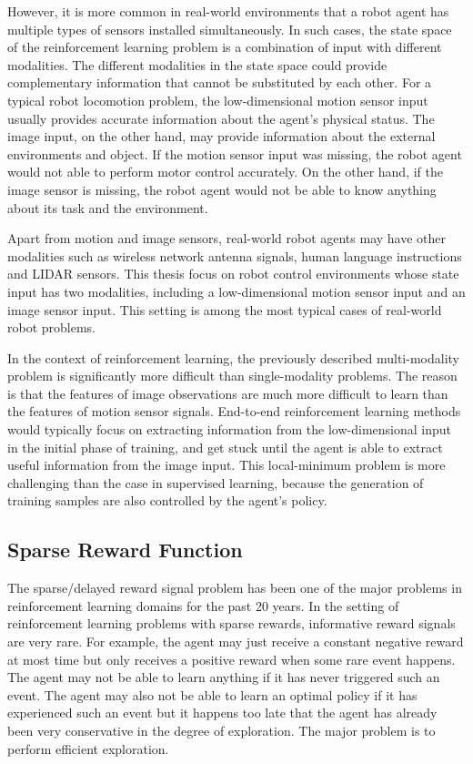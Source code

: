 However, it is more common in real-world environments that a robot agent has multiple types of sensors installed simultaneously. In such cases, the state space of the reinforcement learning problem is a combination of input with different modalities. The different modalities in the state space could provide complementary information that cannot be substituted by each other. For a typical robot locomotion problem, the low-dimensional motion sensor input usually provides accurate information about the agent's physical status. The image input, on the other hand, may provide information about the external environments and object. If the motion sensor input was missing, the robot agent would not able to perform motor control accurately. On the other hand, if the image sensor is missing, the robot agent would not be able to know anything about its task and the environment.


Apart from motion and image sensors, real-world robot agents may have other modalities such as wireless network antenna signals, human language instructions and LIDAR sensors. This thesis focus on robot control environments whose state input has two modalities, including a low-dimensional motion sensor input and an image sensor input. This setting is among the most typical cases of real-world robot problems.

In the context of reinforcement learning, the previously described multi-modality problem is significantly more difficult than single-modality problems. The reason is that the features of image observations are much more difficult to learn than the features of motion sensor signals. End-to-end reinforcement learning methods would typically focus on extracting information from the low-dimensional input in the initial phase of training, and get stuck until the agent is able to extract useful information from the image input. This local-minimum problem is more challenging than the case in supervised learning, because the generation of training samples are also controlled by the agent's policy.

\subsection{Sparse Reward Function}
The sparse/delayed reward signal problem has been one of the major problems in reinforcement learning domains for the past 20 years. In the setting of reinforcement learning problems with sparse rewards, informative reward signals are very rare. For example, the agent may just receive a constant negative reward at most time but only receives a positive reward when some rare event happens. The agent may not be able to learn anything if it has never triggered such an event. The agent may also not be able to learn an optimal policy if it has experienced such an event but it happens too late that the agent has already been very conservative in the degree of exploration. The major problem is to perform efficient exploration.

